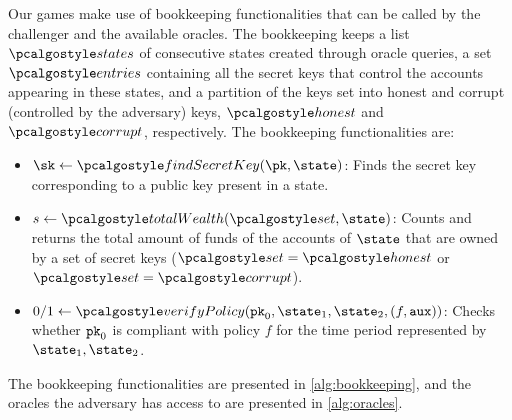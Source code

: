 Our games make use of bookkeeping functionalities that can be called by the challenger and the available oracles. The bookkeeping keeps a list $\stateslist$ of consecutive states created through oracle queries, a set $\entries$ containing all the secret keys that control the accounts appearing in these states, and a partition of the keys set into honest and corrupt (controlled by the adversary) keys, $\honest$ and $\corrupt$, respectively. 
The bookkeeping functionalities are:
\begin{itemize}
    \item $\sk \gets \findsecretkey(\pk, \state)$: Finds the secret key corresponding to a public key present in a state. 
    \item $s\gets \countwealth(\honestorcorrupt, \state)$: Counts and returns the total amount of funds of the accounts of $\state$ that are owned by a set of secret keys ($\honestorcorrupt = \honest$ or $\honestorcorrupt = \corrupt$).
    \item $0 / 1 \gets \verifypolicy(\inpk, \snap_1, \snap_2, (f, \aux))$: Checks whether $\textup{\texttt{pk}}_{0}$ is compliant with policy $f$ for the time period represented by $\snap_1, \snap_2$.
\end{itemize}


The bookkeeping functionalities are presented in \autoref{alg:bookkeeping}, and the oracles the adversary has access to are presented in \autoref{alg:oracles}.


